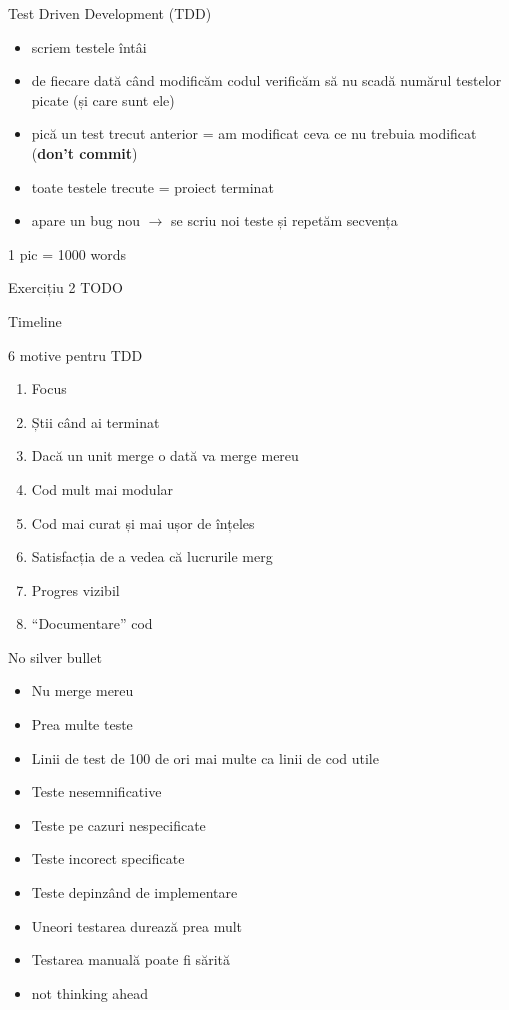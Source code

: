 \documentclass{beamer}
\begin{document}
\begin{frame}{Test Driven Development (TDD)}
  \begin{itemize}[<+->]
    \item scriem testele întâi
    \item de fiecare dată când modificăm codul verificăm să nu scadă numărul
    testelor picate (și care sunt ele)
    \item pică un test trecut anterior = am modificat ceva ce nu trebuia
    modificat (\textbf{don't commit})
    \item toate testele trecute = proiect terminat
    \item apare un bug nou $\rightarrow$ se scriu noi teste și repetăm
    secvența
  \end{itemize}
\end{frame}

\begin{frame}{1 pic = 1000 words}
\end{frame}

\begin{frame}{Exercițiu 2}
  TODO
\end{frame}

\begin{frame}{Timeline}
\end{frame}

\begin{frame}{6 motive pentru TDD}
  \begin{enumerate}[<+->]
    \item Focus
    \item Știi când ai terminat
    \item Dacă un unit merge o dată va merge mereu
    \item Cod mult mai modular
    \item Cod mai curat și mai ușor de înțeles
    \item Satisfacția de a vedea că lucrurile merg
    \item Progres vizibil
    \item ``Documentare'' cod
  \end{enumerate}
\end{frame}

\begin{frame}{No silver bullet}
  \begin{itemize}[<+->]
    \item Nu merge mereu
    \item Prea multe teste
    \item Linii de test de 100 de ori mai multe ca linii de cod utile
    \item Teste nesemnificative
    \item Teste pe cazuri nespecificate
    \item Teste incorect specificate
    \item Teste depinzând de implementare
    \item Uneori testarea durează prea mult
    \item Testarea manuală poate fi sărită
    \item not thinking ahead
  \end{itemize}
\end{frame}
\end{document}
